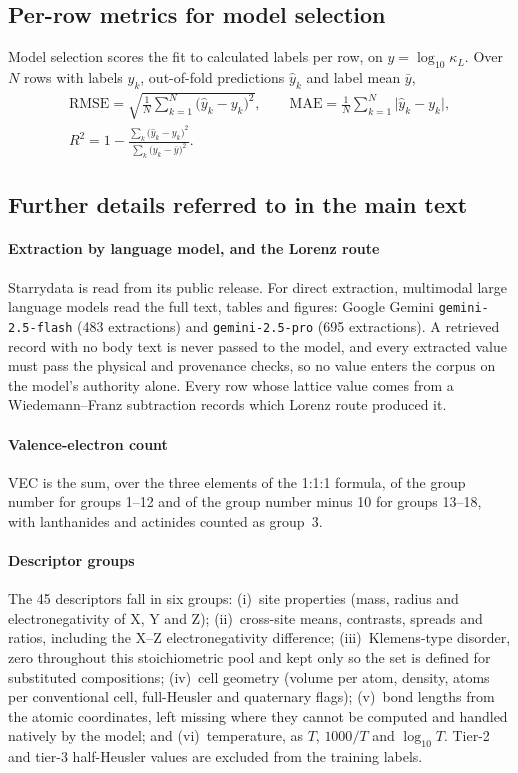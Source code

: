 \documentclass[preprint, 12pt]{elsarticle}
\begin{document}
\subsection*{Per-row metrics for model selection}

Model selection scores the fit to calculated labels per row, on $y=\log_{10}\kappa_L$. Over $N$ rows
with labels $y_k$, out-of-fold predictions $\hat{y}_k$ and label mean $\bar{y}$,
%
\begin{gather*}
  \mathrm{RMSE} = \sqrt{\frac{1}{N}\sum_{k=1}^{N}\bigl(\hat{y}_k-y_k\bigr)^2},
  \qquad
  \mathrm{MAE} = \frac{1}{N}\sum_{k=1}^{N}\bigl|\hat{y}_k-y_k\bigr|,
  \\
  R^2 = 1-\frac{\sum_k\bigl(\hat{y}_k-y_k\bigr)^2}{\sum_k\bigl(y_k-\bar{y}\bigr)^2}.
\end{gather*}

\subsection*{Further details referred to in the main text}

\paragraph{Extraction by language model, and the Lorenz route} Starrydata is read from its public
release. For direct extraction, multimodal large language models read the full text, tables and
figures: Google Gemini \texttt{gemini-2.5-flash} (\num{483} extractions) and
\texttt{gemini-2.5-pro} (\num{695} extractions). A retrieved record with no body text is never
passed to the model, and every extracted value must pass the physical and provenance checks, so no
value enters the corpus on the model's authority alone. Every row whose lattice value comes from a
Wiedemann--Franz subtraction records which Lorenz route produced it.

\paragraph{Valence-electron count} VEC is the sum, over the three elements of the 1:1:1 formula, of
the group number for groups 1--12 and of the group number minus 10 for groups 13--18, with
lanthanides and actinides counted as group~3.

\paragraph{Descriptor groups} The \num{45} descriptors fall in six groups: (i)~site properties
(mass, radius and electronegativity of X, Y and Z); (ii)~cross-site means, contrasts, spreads and
ratios, including the X--Z electronegativity difference; (iii)~Klemens-type disorder, zero
throughout this stoichiometric pool and kept only so the set is defined for substituted
compositions; (iv)~cell geometry (volume per atom, density, atoms per conventional cell,
full-Heusler and quaternary flags); (v)~bond lengths from the atomic coordinates, left missing
where they cannot be computed and handled natively by the model; and (vi)~temperature, as $T$,
$1000/T$ and $\log_{10}T$. Tier-2 and tier-3 half-Heusler values are excluded from the training
labels.
\end{document}
